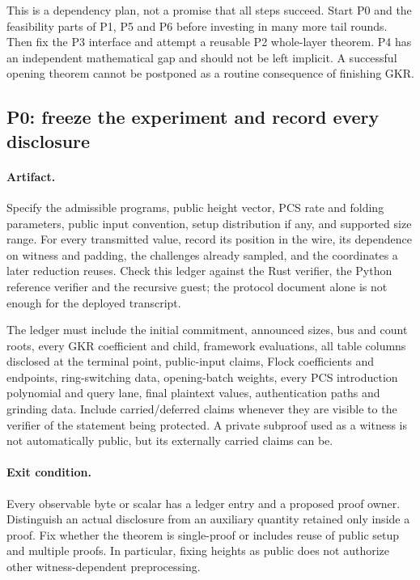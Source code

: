 This is a dependency plan, not a promise that all steps succeed. Start P0 and the feasibility parts of P1, P5 and P6 before investing in many more tail rounds. Then fix the P3 interface and attempt a reusable P2 whole-layer theorem. P4 has an independent mathematical gap and should not be left implicit. A successful opening theorem cannot be postponed as a routine consequence of finishing GKR.

\subsection{P0: freeze the experiment and record every disclosure}

\paragraph{Artifact.} Specify the admissible programs, public height vector, PCS rate and folding parameters, public input convention, setup distribution if any, and supported size range. For every transmitted value, record its position in the wire, its dependence on witness and padding, the challenges already sampled, and the coordinates a later reduction reuses. Check this ledger against the Rust verifier, the Python reference verifier and the recursive guest; the protocol document alone is not enough for the deployed transcript.

The ledger must include the initial commitment, announced sizes, bus and count roots, every GKR coefficient and child, framework evaluations, all table columns disclosed at the terminal point, public-input claims, Flock coefficients and endpoints, ring-switching data, opening-batch weights, every PCS introduction polynomial and query lane, final plaintext values, authentication paths and grinding data. Include carried/deferred claims whenever they are visible to the verifier of the statement being protected. A private subproof used as a witness is not automatically public, but its externally carried claims can be.

\paragraph{Exit condition.} Every observable byte or scalar has a ledger entry and a proposed proof owner. Distinguish an actual disclosure from an auxiliary quantity retained only inside a proof. Fix whether the theorem is single-proof or includes reuse of public setup and multiple proofs. In particular, fixing heights as public does not authorize other witness-dependent preprocessing.

